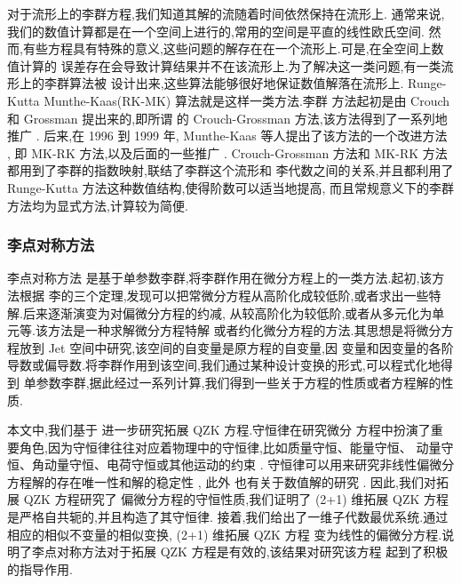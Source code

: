对于流形上的李群方程,我们知道其解的流随着时间依然保持在流形上.
通常来说,我们的数值计算都是在一个空间上进行的,常用的空间是平直的线性欧氏空间.
然而,有些方程具有特殊的意义,这些问题的解存在在一个流形上.可是,在全空间上数值计算的
误差存在会导致计算结果并不在该流形上.为了解决这一类问题,有一类流形上的李群算法被
设计出来,这些算法能够很好地保证数值解落在流形上. Runge-Kutta Munthe-Kaas(RK-MK) 算法就是这样一类方法.李群
方法起初是由 Crouch 和 Grossman \cite{crouch1993numerical} 提出来的,即所谓
的 Crouch-Grossman 方法,该方法得到了一系列地推广
\cite{faleinsen2001multi,zaletkin2010numerical,bulychev2001numerical,buono2003numerical,billo1992numerical}.
后来,在 1996 到 1999 年, Munthe-Kaas  等人提出了该方法的一个改进方法
\cite{mk1996lie,mk1997numerical,mk1998runge,mk1999high}, 即 MK-RK 方法,以及后面的一些推广 \cite{ostermann2010exponential,owren2000the,bruls2012lie,munthe2013onpost,garcla2011onalg}.
Crouch-Grossman 方法和 MK-RK 方法都用到了李群的指数映射,联结了李群这个流形和
李代数之间的关系,并且都利用了 Runge-Kutta 方法这种数值结构,使得阶数可以适当地提高,
而且常规意义下的李群方法均为显式方法,计算较为简便.

\subsubsection*{\textbf{李点对称方法}}

李点对称方法 \cite{olver2000app} 是基于单参数李群,将李群作用在微分方程上的一类方法.起初,该方法根据
李的三个定理,发现可以把常微分方程从高阶化成较低阶,或者求出一些特解.后来逐渐演变为对偏微分方程的约减,
从较高阶化为较低阶,或者从多元化为单元等.该方法是一种求解微分方程特解
或者约化微分方程的方法.其思想是将微分方程放到 Jet 空间中研究,该空间的自变量是原方程的自变量,因
变量和因变量的各阶导数或偏导数.将李群作用到该空间,我们通过某种设计变换的形式,可以程式化地得到
单参数李群,据此经过一系列计算,我们得到一些关于方程的性质或者方程解的性质.

本文中,我们基于 \cite{sjoberg2007dou} 进一步研究拓展 QZK 方程.守恒律在研究微分
方程中扮演了重要角色,因为守恒律往往对应着物理中的守恒律,比如质量守恒、能量守恒、
动量守恒、角动量守恒、电荷守恒或其他运动的约束 \cite{mushtaq2005non,song2013top,song2013dom}.
守恒律可以用来研究非线性偏微分方程解的存在唯一性和解的稳定性 \cite{wang2014soli}, 此外
也有关于数值解的研究 \cite{wazwaz2005exact,wazwaz2008the}. 因此,我们对拓展 QZK 方程研究了
偏微分方程的守恒性质,我们证明了 (2+1) 维拓展 QZK 方程是严格自共轭的,并且构造了其守恒律.
接着,我们给出了一维子代数最优系统.通过相应的相似不变量的相似变换, (2+1) 维拓展 QZK 方程
变为线性的偏微分方程.说明了李点对称方法对于拓展 QZK 方程是有效的,该结果对研究该方程
起到了积极的指导作用.

